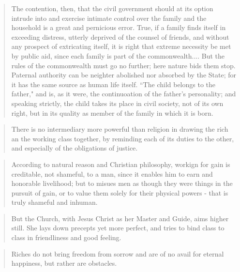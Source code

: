 \begin{quote}
  The contention, then, that the civil government should at its option intrude into and exercise intimate control over the family and the household is a great and pernicious error. True, if a family finds itself in exceeding distress, utterly deprived of the counsel of friends, and without any prospect of extricating itself, it is right that extreme necessity be met by public aid, since each family is part of the commonwealth.... But the rules of the commonwealth must go no further; here nature bids them stop. Paternal authority can be neighter abolished nor absorbed by the State; for it has the same source as human life itself. ``The child belongs to the father," and is, as it were, the continuoation of the father's personality; and speaking strictly, the child takes its place in civil society, not of its own right, but in its quality as member of the family in which it is born.
\end{quote}

\begin{quote}
  There is no intermediary more powerful than religion in drawing the rich an the working class together, by reminding each of its duties to the other, and especially of the obligations of justice.
\end{quote}

\begin{quote}
  According to natural reason and Christian philosophy, workign for gain is creditable, not shameful, to a man, since it enables him to earn and honorable livelihood; but to misues men as though they were things in the pursuit of gain, or to value them solely for their physical powers - that is truly shameful and inhuman.
\end{quote}

\begin{quote}
  But the Church, with Jesus Christ as her Master and Guide, aims higher still. She lays down precepts yet more perfect, and tries to bind class to class in friendliness and good feeling.
\end{quote}

\begin{quote}
  Riches do not bring freedom from sorrow and are of no avail for eternal happiness, but rather are obstacles.
\end{quote}

